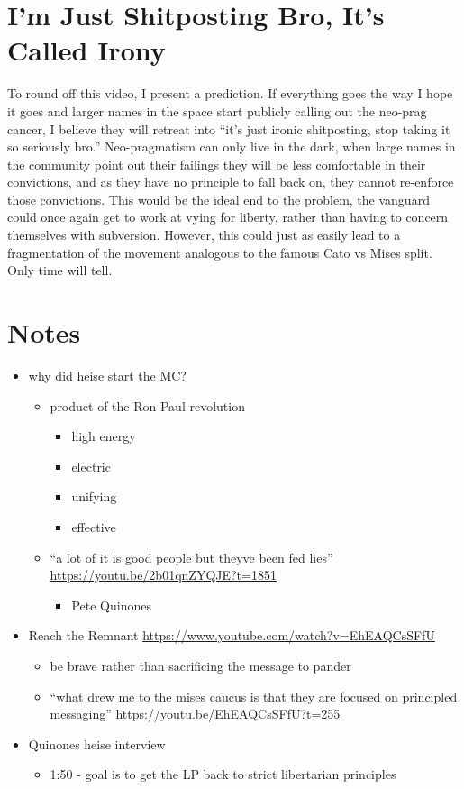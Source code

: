 \documentclass[11pt]{article}
\begin{document}
\section{I'm Just Shitposting Bro, It's Called Irony}
\label{sec:org741f1aa}
To round off this video, I present a prediction. If everything goes the way I hope it goes and larger names in the space start publicly calling out the neo-prag cancer, I believe they will retreat into ``it's just ironic shitposting, stop taking it so seriously bro.'' Neo-pragmatism can only live in the dark, when large names in the community point out their failings they will be less comfortable in their convictions, and as they have no principle to fall back on, they cannot re-enforce those convictions. This would be the ideal end to the problem, the vanguard could once again get to work at vying for liberty, rather than having to concern themselves with subversion. However, this could just as easily lead to a fragmentation of the movement analogous to the famous Cato vs Mises split. Only time will tell.

\section{Notes}
\label{sec:orgf8c1afe}
\begin{itemize}
\item why did heise start the MC?
\begin{itemize}
\item product of the Ron Paul revolution
\begin{itemize}
\item high energy
\item electric
\item unifying
\item effective
\end{itemize}
\item ``a lot of it is good people but theyve been fed lies'' \url{https://youtu.be/2b01qnZYQJE?t=1851}
\begin{itemize}
\item Pete Quinones
\end{itemize}
\end{itemize}
\item Reach the Remnant \url{https://www.youtube.com/watch?v=EhEAQCsSFfU}
\begin{itemize}
\item be brave rather than sacrificing the message to pander
\item ``what drew me to the mises caucus is that they are focused on principled messaging'' \url{https://youtu.be/EhEAQCsSFfU?t=255}
\end{itemize}
\item Quinones heise interview
\begin{itemize}
\item 1:50 - goal is to get the LP back to strict libertarian principles
\end{itemize}
\end{itemize}
\end{document}

